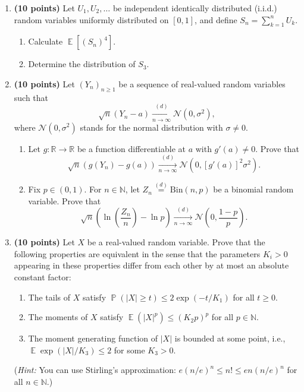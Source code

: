 \documentclass[11pt,a4paper]{article}
\DeclareMathOperator{\E}{\mathbb{E}}
\DeclareMathOperator{\Pbb}{\mathbb{P}}
\begin{document}
\begin{enumerate}[label=\textbf{\arabic*.}]
    \item \textbf{(10 points)} Let $U_1, U_2, \dots$ be independent identically distributed (i.i.d.) random variables uniformly distributed on $[0, 1]$, and define $S_n = \sum_{k=1}^n U_k$.
    \begin{enumerate}[label=(\alph*)]
        \item Calculate $\E[(S_n)^4]$.
        \item Determine the distribution of $S_3$.
    \end{enumerate}

    \item \textbf{(10 points)} Let $(Y_n)_{n \ge 1}$ be a sequence of real-valued random variables such that
    \[
    \sqrt{n}(Y_n - a) \xrightarrow[n \to \infty]{(d)} \mathcal{N}(0, \sigma^2),
    \]
    where $\mathcal{N}(0, \sigma^2)$ stands for the normal distribution with $\sigma \neq 0$.
    \begin{enumerate}[label=(\alph*)]
        \item Let $g : \mathbb{R} \to \mathbb{R}$ be a function differentiable at $a$ with $g'(a) \neq 0$. Prove that
        \[
        \sqrt{n}(g(Y_n) - g(a)) \xrightarrow[n \to \infty]{(d)} \mathcal{N}\left(0, [g'(a)]^2 \sigma^2\right).
        \]
        \item Fix $p \in (0, 1)$. For $n \in \mathbb{N}$, let $Z_n \stackrel{(d)}{=} \mathrm{Bin}(n, p)$ be a binomial random variable. Prove that
        \[
        \sqrt{n} \left( \ln\left(\frac{Z_n}{n}\right) - \ln p \right) \xrightarrow[n \to \infty]{(d)} \mathcal{N}\left(0, \frac{1 - p}{p}\right).
        \]
    \end{enumerate}

    \item \textbf{(10 points)} Let $X$ be a real-valued random variable. Prove that the following properties are equivalent in the sense that the parameters $K_i > 0$ appearing in these properties differ from each other by at most an absolute constant factor:
    \begin{enumerate}[label=(\alph*)]
        \item The tails of $X$ satisfy $\Pbb(|X| \ge t) \le 2 \exp(-t / K_1)$ for all $t \ge 0$.
        \item The moments of $X$ satisfy $\E(|X|^p) \le (K_2 p)^p$ for all $p \in \mathbb{N}$.
        \item The moment generating function of $|X|$ is bounded at some point, i.e., $\E \exp(|X| / K_3) \le 2$ for some $K_3 > 0$.
    \end{enumerate}
    (\textit{Hint:} You can use Stirling's approximation: $e(n/e)^n \le n! \le e n (n/e)^n$ for all $n \in \mathbb{N}$.)


\end{enumerate}
\end{document}
